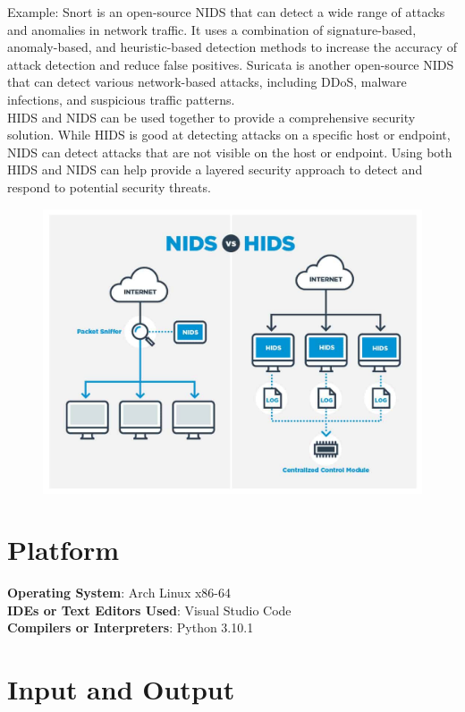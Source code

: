 \documentclass[11pt]{article}
\begin{document}
Example: Snort is an open-source NIDS that can detect a wide range of attacks and anomalies in network traffic. It uses a combination of signature-based, anomaly-based, and heuristic-based detection methods to increase the accuracy of attack detection and reduce false positives. Suricata is another open-source NIDS that can detect various network-based attacks, including DDoS, malware infections, and suspicious traffic patterns.\\

HIDS and NIDS can be used together to provide a comprehensive security solution. While HIDS is good at detecting attacks on a specific host or endpoint, NIDS can detect attacks that are not visible on the host or endpoint. Using both HIDS and NIDS can help provide a layered security approach to detect and respond to potential security threats.


\begin{figure}[H]
    \centering
    \includegraphics[width=.85\textwidth]{NIDS-vs-HIDS.jpg}
\end{figure}
\section{Platform}
\textbf{Operating System}: Arch Linux x86-64 \\
\textbf{IDEs or Text Editors Used}: Visual Studio Code\\
\textbf{Compilers or Interpreters}: Python 3.10.1\\

\section{Input and Output}
\end{document}
